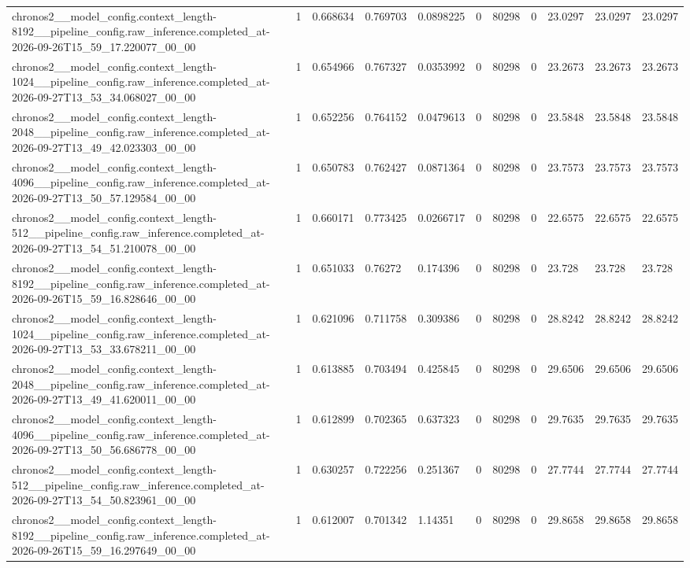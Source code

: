 \begin{tabular}{lllllllllll}
chronos2\_\_model\_config.context\_length-8192\_\_pipeline\_config.raw\_inference.completed\_at-2026-09-26T15\_59\_17.220077\_00\_00 & 1 & 0.668634 & 0.769703 & 0.0898225 & 0 & 80298 & 0 & 23.0297 & 23.0297 & 23.0297 \\
chronos2\_\_model\_config.context\_length-1024\_\_pipeline\_config.raw\_inference.completed\_at-2026-09-27T13\_53\_34.068027\_00\_00 & 1 & 0.654966 & 0.767327 & 0.0353992 & 0 & 80298 & 0 & 23.2673 & 23.2673 & 23.2673 \\
chronos2\_\_model\_config.context\_length-2048\_\_pipeline\_config.raw\_inference.completed\_at-2026-09-27T13\_49\_42.023303\_00\_00 & 1 & 0.652256 & 0.764152 & 0.0479613 & 0 & 80298 & 0 & 23.5848 & 23.5848 & 23.5848 \\
chronos2\_\_model\_config.context\_length-4096\_\_pipeline\_config.raw\_inference.completed\_at-2026-09-27T13\_50\_57.129584\_00\_00 & 1 & 0.650783 & 0.762427 & 0.0871364 & 0 & 80298 & 0 & 23.7573 & 23.7573 & 23.7573 \\
chronos2\_\_model\_config.context\_length-512\_\_pipeline\_config.raw\_inference.completed\_at-2026-09-27T13\_54\_51.210078\_00\_00 & 1 & 0.660171 & 0.773425 & 0.0266717 & 0 & 80298 & 0 & 22.6575 & 22.6575 & 22.6575 \\
chronos2\_\_model\_config.context\_length-8192\_\_pipeline\_config.raw\_inference.completed\_at-2026-09-26T15\_59\_16.828646\_00\_00 & 1 & 0.651033 & 0.76272 & 0.174396 & 0 & 80298 & 0 & 23.728 & 23.728 & 23.728 \\
chronos2\_\_model\_config.context\_length-1024\_\_pipeline\_config.raw\_inference.completed\_at-2026-09-27T13\_53\_33.678211\_00\_00 & 1 & 0.621096 & 0.711758 & 0.309386 & 0 & 80298 & 0 & 28.8242 & 28.8242 & 28.8242 \\
chronos2\_\_model\_config.context\_length-2048\_\_pipeline\_config.raw\_inference.completed\_at-2026-09-27T13\_49\_41.620011\_00\_00 & 1 & 0.613885 & 0.703494 & 0.425845 & 0 & 80298 & 0 & 29.6506 & 29.6506 & 29.6506 \\
chronos2\_\_model\_config.context\_length-4096\_\_pipeline\_config.raw\_inference.completed\_at-2026-09-27T13\_50\_56.686778\_00\_00 & 1 & 0.612899 & 0.702365 & 0.637323 & 0 & 80298 & 0 & 29.7635 & 29.7635 & 29.7635 \\
chronos2\_\_model\_config.context\_length-512\_\_pipeline\_config.raw\_inference.completed\_at-2026-09-27T13\_54\_50.823961\_00\_00 & 1 & 0.630257 & 0.722256 & 0.251367 & 0 & 80298 & 0 & 27.7744 & 27.7744 & 27.7744 \\
chronos2\_\_model\_config.context\_length-8192\_\_pipeline\_config.raw\_inference.completed\_at-2026-09-26T15\_59\_16.297649\_00\_00 & 1 & 0.612007 & 0.701342 & 1.14351 & 0 & 80298 & 0 & 29.8658 & 29.8658 & 29.8658 \\

\end{tabular}
